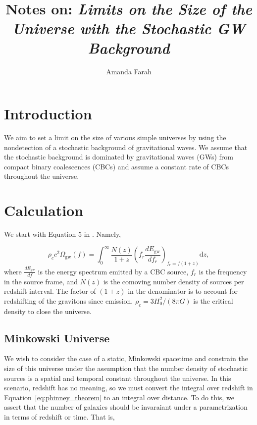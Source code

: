 \documentclass[]{article}
\title{Notes on: \emph{Limits on the Size of the Universe with the Stochastic GW Background}}
\author{Amanda Farah}
\newcommand{\Ogw}{\Omega_{\mathrm{gw}}}
\begin{document}
\maketitle

%

\section{Introduction}
We aim to set a limit on the size of various simple universes by using the nondetection of a stochastic background of gravitational waves. 
We assume that the stochastic background is dominated by gravitational waves (GWs) from compact binary coalescences (CBCs) and assume a constant rate of CBCs throughout the universe.

\section{Calculation}

We start with Equation 5 in \cite{Phinney_theorem}. Namely,

\begin{equation}
	\rho_c c^2 \Ogw(f) =  \int_{0}^{\infty} \frac{N(z)}{1+z} (f_r \frac{dE_{\mathrm{gw}}}{df_r})_{f_r = f(1+z)} \mathrm{d}z ,
	\label{eq:phinney_theorem}
\end{equation}
where $\frac{dE_{\mathrm{gw}}}{df}$ is the energy spectrum emitted by a CBC source, $f_r$ is the frequency in the source frame, and $N(z)$ is the comoving number density of sources per redshift interval.
The factor of $(1+z)$ in the denominator is to account for redshifting of the gravitons since emission. 
$\rho_c = 3 H_0^2/(8\pi G)$ is the critical density to close the universe.
	
\subsection{Minkowski Universe}	
We wish to consider the case of a static, Minkowski spacetime and constrain the size of this universe under the assumption that the number density of stochastic sources is a spatial and temporal constant throughout the universe.
In this scenario, redshift has no meaning, so we must convert the integral over redshift in Equation~\ref{eq:phinney_theorem} to an integral over distance.
To do this, we assert that the number of galaxies should be invaraiant under a parametrization in terms of redshift or time. 
That is,
\end{document}
